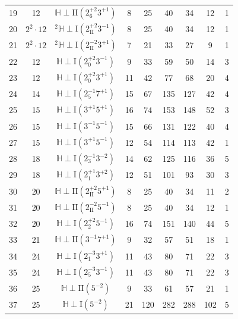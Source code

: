 \documentclass{amsart}
\theoremstyle{definition}
\theoremstyle{remark}
\begin{document}
\begin{center}
\begin{longtable}{c|c|c|c|c|c|c|c|c}
  19 &  12 & $\mathbb{H} \perp \mathrm{II}(2_{6}^{+2}3^{+1})$   & 8 & 25 & 40 & 34 & 12 & 1 \\
  20 & $2^2 \cdot 12$ & ${}^{2}\!{\mathbb{H}} \perp \mathrm{I}(2_{\mathrm{II}}^{+2}3^{-1})$   & 8 & 25 & 40 & 34 & 12 & 1 \\
  21 & $2^2 \cdot 12$ & ${}^{2}\!{\mathbb{H}} \perp \mathrm{I}(2_{\mathrm{II}}^{-2}3^{+1})$   & 7 & 21 & 33 & 27 & 9 & 1 \\
  22 & 12 & $\mathbb{H} \perp \mathrm{I}(2_{0}^{+2}3^{-1})$   & 9 & 33 & 59 & 50 & 14 & 3 \\
  23 &  12 & $\mathbb{H} \perp \mathrm{I}(2_{0}^{+2}3^{+1})$   & 11 & 42 & 77 & 68 & 20 & 4 \\
  24 & 14 & $\mathbb{H} \perp \mathrm{I}(2_{5}^{-1}7^{+1})$   & 15 & 67 & 135 & 127 & 42 & 4 \\
  25 & 15 & $\mathbb{H} \perp \mathrm{I}(3^{+1}5^{+1})$   & 16 & 74 & 153 & 148 & 52 & 3 \\
  26 & 15 & $\mathbb{H} \perp \mathrm{I}(3^{-1}5^{-1})$   & 15 & 66 & 131 & 122 & 40 & 4 \\
  27 & 15 & $\mathbb{H} \perp \mathrm{I}(3^{+1}5^{-1})$   & 12 & 54 & 114 & 113 & 42 & 1 \\
  28 & 18 & $\mathbb{H} \perp \mathrm{I}(2_{3}^{-1}3^{-2})$   & 14 & 62 & 125 & 116 & 36 & 5 \\
  29 & 18 & $\mathbb{H} \perp \mathrm{I}(2_{1}^{+1}3^{+2})$   & 12 & 51 & 101 & 93 & 30 & 3 \\
  30 &  20 & $\mathbb{H} \perp \mathrm{II}(2_{\mathrm{II}}^{+2}5^{+1})$   & 8 & 25 & 40 & 34 & 11 & 2 \\
  31 &  20 & $\mathbb{H} \perp \mathrm{II}(2_{\mathrm{II}}^{-2}5^{-1})$   & 8 & 25 & 40 & 34 & 12 & 1 \\
  32 & 20 & $\mathbb{H} \perp \mathrm{I}(2_{2}^{+2}5^{-1})$   & 16 & 74 & 151 & 140 & 44 & 5 \\
  33 &  21 & $\mathbb{H} \perp \mathrm{II}(3^{-1}7^{+1})$   & 9 & 32 & 57 & 51 & 18 & 1 \\
  34 &  24 & $\mathbb{H} \perp \mathrm{I}(2_{1}^{-3}3^{+1})$   & 11 & 43 & 80 & 71 & 22 & 3 \\
  35 &  24 & $\mathbb{H} \perp \mathrm{I}(2_{5}^{-3}3^{-1})$   & 11 & 43 & 80 & 71 & 22 & 3 \\
  36 & 25 & $\mathbb{H} \perp \mathrm{II}(5^{-2})$   & 9 & 33 & 61 & 57 & 21 & 1 \\
  37 &  25 & $\mathbb{H} \perp \mathrm{I}(5^{-2})$   & 21 & 120 & 282 & 288 & 102 & 5 \\

\end{longtable}
\end{center}
\end{document}
